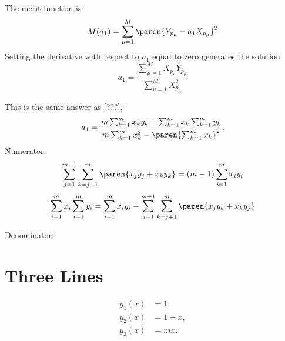 The merit function is
  \begin{equation*}   %
      M(a_{1}) = \sum_{\mu=1}^{M} \paren{Y_{p_{\mu}} - a_{1} X_{p_{\mu}}}^{2}
  \end{equation*}
Setting the derivative with respect to $a_{1}$ equal to zero generates the solution
  \begin{equation*}   %
      a_{1} = \frac{\sum_{\mu=1}^{M} X_{p_{\mu}} Y_{p_{\mu}}} {\sum_{\mu=1}^{M} X_{p_{\mu}}^{2}}
  \end{equation*}

This is the same answer as \eqref{???},
`  \begin{equation*}   %
      a_{1} = \frac{m \sum_{k=1}^{m}x_{k}y_{k} - \sum_{k=1}^{m}x_{k}\sum_{k=1}^{m}y_{k}} {m \sum_{k=1}^{m}x_{k}^{2} - \paren{\sum_{k=1}^{m}x_{k}}^{2}} .
  \end{equation*}
Numerator:
  \begin{equation*}   %
      \sum_{j=1}^{m-1} \sum_{k=j+1}^{m} \paren{x_{j}y_{j} + x_{k}y_{k}} = (m-1) \sum_{i=1}^{m} x_{i}y_{i}
   \label{eq:rule 1}
  \end{equation*}
  \begin{equation*}   %
   	  \sum_{i=1}^{m}x_{i} \sum_{i=1}^{m}y_{i} = \sum_{i=1}^{m}x_{i}y_{i} - 
      \sum_{j=1}^{m-1} \sum_{k=j+1}^{m} \paren{x_{j}y_{k} + x_{k}y_{j}} 
   \label{eq:rule 2}
  \end{equation*}


Denominator:

\section{Three Lines}  %
  \begin{equation*}   %
     \begin{split}
       y_{1}(x) &= 1, \\
       y_{2}(x) &= 1 - x, \\
       y_{3}(x) &= m x.
     \end{split}
  \end{equation*}

